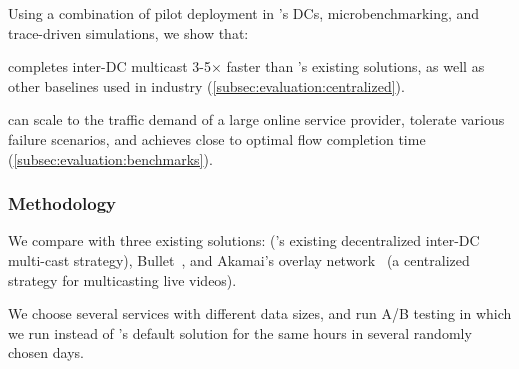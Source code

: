 Using a combination of pilot deployment in \company's DCs, microbenchmarking, and trace-driven simulations, we show that:
\begin{packedenumerate}
\item \name completes inter-DC multicast 3-5$\times$ faster than
\company's existing solutions, as well as other baselines used in
industry (\Section\ref{subsec:evaluation:centralized}).


\item \name can scale to the traffic demand of a large online
service provider, tolerate various failure scenarios, and achieves
close to optimal flow completion time
(\Section\ref{subsec:evaluation:benchmarks}).


\end{packedenumerate}
\subsubsection{Methodology}

We compare \name with three existing solutions: \alg (\company's
existing decentralized inter-DC multi-cast strategy),
Bullet~\cite{kostic2003bullet}, and Akamai's overlay
network~\cite{Andreev2013Designing} (a centralized strategy for
multicasting live videos).


We choose several services with different data sizes, and run
A/B testing in which we run \name instead of \company's default
solution \alg for the same hours in several randomly chosen days.

